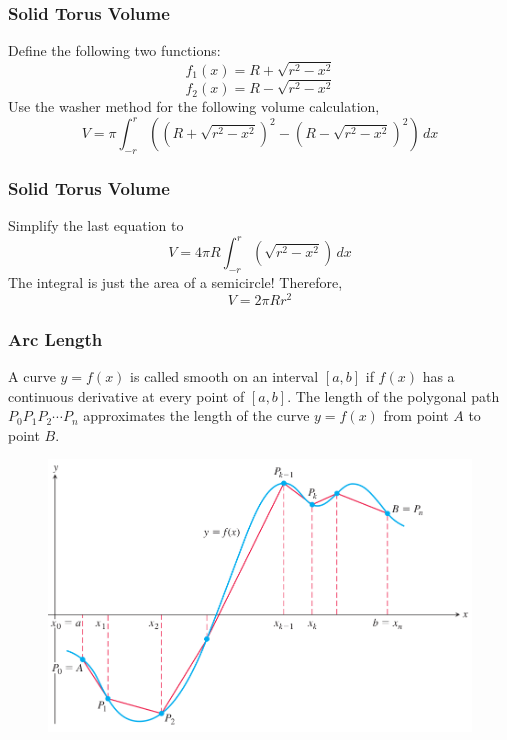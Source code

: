 \documentclass[xcolor=dvipsnames]{beamer}
\begin{document}
\begin{frame}
  \frametitle{Solid Torus Volume}
  Define the following two functions:
  \begin{equation}
    \label{eq:chieyech}
    f_{1}(x)=R+\sqrt{r^{2}-x^{2}}
  \end{equation}
  \begin{equation}
    \label{eq:chieyech}
    f_{2}(x)=R-\sqrt{r^{2}-x^{2}}
  \end{equation}
  Use the washer method for the following volume calculation,
  \begin{equation}
    \label{eq:xeiliaci}
    V=\pi\int_{-r}^{r}\left(\left(R+\sqrt{r^{2}-x^{2}}\right)^{2}-\left(R-\sqrt{r^{2}-x^{2}}\right)^{2}\right)\,dx
  \end{equation}
\end{frame}

\begin{frame}
  \frametitle{Solid Torus Volume}
  Simplify the last equation to
  \begin{equation}
    \label{eq:ahbohyae}
    V=4\pi{}R\int_{-r}^{r}\left(\sqrt{r^{2}-x^{2}}\right)\,dx
  \end{equation}
  The integral is just the area of a semicircle! Therefore,
  \begin{equation}
    \label{eq:ohaesuci}
    V=2\pi{}Rr^{2}
  \end{equation}
\end{frame}

\begin{frame}
  \frametitle{Arc Length}
  A curve $y=f(x)$ is called \alert{smooth} on an interval $[a,b]$ if
  $f(x)$ has a continuous derivative at every point of $[a,b]$. The
  length of the polygonal path $P_{0}P_{1}P_{2}\cdots{}P_{n}$
  approximates the length of the curve $y=f(x)$ from point $A$ to
  point $B$.
  \begin{figure}[h]
    \includegraphics[scale=0.25]{./diagrams/pollen.png}
  \end{figure}
  \end{frame}
\end{document}

